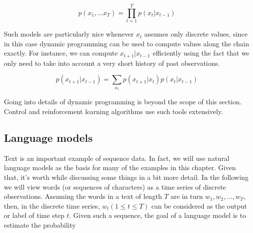 $$p(x_1, \ldots x_T) = \prod_{t=1}^T p(x_t|x_{t-1})$$

Such models are particularly nice whenever $x_t$ assumes only discrete values, since in this case dynamic programming can be used to compute values along the chain exactly. For instance, we can compute $x_{t+1}|x_{t-1}$ efficiently using the fact that we only need to take into account a very short history of past observations.

$$p(x_{t+1}|x_{t-1}) = \sum_{x_t} p(x_{t+1}|x_t) p(x_t|x_{t-1})$$

Going into details of dynamic programming is beyond the scope of this section. Control and reinforcement learning algorithms use such tools extensively.





\subsection{Language models}\label{subsec:lang_models}

Text is an important example of sequence data. In fact, we will use natural language models as the basis for many of the examples in this chapter. Given that, it’s worth while discussing some things in a bit more detail. In the following we will view words (or sequences of characters) as a time series of discrete observations. Assuming the words in a text of length $T$ are in turn $w_1, w_2, \ldots, w_T$, then, in the discrete time series, $w_t(1 \leq t \leq T)$ can be considered as the output or label of time step $t$. Given such a sequence, the goal of a language model is to estimate the probability

